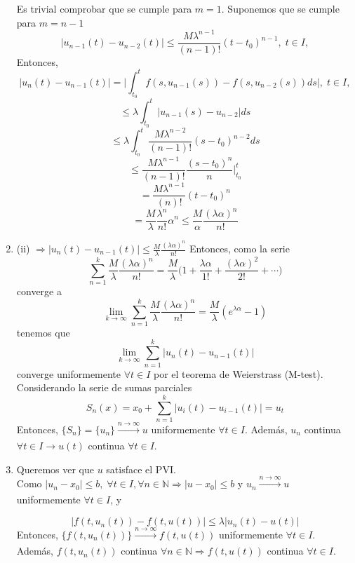 \begin{dem}
\begin{enumerate}[label=(\roman*)]
      Es trivial comprobar que se cumple para $m=1$. Suponemos que se cumple para $m=n-1$
      \[ 
        | u_{n-1}(t) - u_{n-2}(t) | \leq \frac{M \lambda^{n-1}}{(n-1)!}(t - t_{0})^{n-1}, \; t \in I,
      \] 
      Entonces, 
      \[ 
        | u_{n}(t) - u_{n-1}(t) | =  \Big | \int_{t_{0}}^{t} f(s, u_{n-1}(s)) - f(s, u_{n-2}(s)) ds \Big |, \; t \in I,
      \] 
      \[ 
        \leq \lambda \int_{t_{0}}^{t} | u_{n-1}(s) - u_{n-2} | ds
      \] 
      \[ 
        \leq \lambda \int_{t_{0}}^{t} \frac{M \lambda^{n-2}}{(n-1)!}(s - t_{0})^{n-2} ds 
      \] 
      \[ 
        \leq  \frac{M \lambda^{n-1}}{(n-1)!} \frac{(s-t_{0})^{n}}{n} \Bigg |_{t_{0}}^{t}
      \] 
      \[ 
        = \frac{M \lambda^{n-1}}{(n)!} (t - t_{0})^n 
      \] 
      \[ 
        = \frac{M}{\lambda} \frac{\lambda^n}{n!} \alpha^n \leq \frac{M}{\alpha} \frac{(\lambda \alpha)^n}{n!}
      \] 
    \item (ii) $\Rightarrow | u_{n}(t) - u_{n-1}(t) | \leq \frac{M}{\lambda} \frac{(\lambda \alpha)^{n}}{n!}$ Entonces, como la serie
      \[ 
        \sum_{n = 1}^{k} \frac{M}{\lambda}\frac{(\lambda \alpha)^{n}}{n!} = \frac{M}{\lambda}\big ( 1 + \frac{\lambda \alpha}{1!} + \frac{(\lambda \alpha)^{2}}{2!}  + \cdots \big )
      \] 
      converge a 
      \[ 
        \lim_{k \to \infty} \sum_{n = 1}^{k} \frac{M}{\lambda}\frac{(\lambda \alpha)^{n}}{n!} = \frac{M}{\lambda} ( e^{\lambda \alpha} -1)
      \] 
      tenemos que 
      \[ 
        \lim_{k \to \infty} \sum_{n = 1}^{k} | u_{n}(t) - u_{n-1}(t) | 
      \] 
      converge uniformemente $\forall t \in I$ por el teorema de Weierstrass (M-test).
      \\
      
      Considerando la serie de sumas parciales
      \[ 
        S_{n}(x) = x_{0} + \sum_{n=1}^{k} | u_{i}(t) - u_{i-1}(t) | = u_{t}
      \] 
      Entonces, $\{ S_{n} \} = \{ u_{n} \} \xrightarrow[]{n \rightarrow \infty} u$ uniformemente $\forall t \in I$. Además, $u_{n}$ continua $\forall t \in I \rightarrow u(t)$ continua $\forall t \in I$.
    \item Queremos ver que $u$ satisface el PVI. \\

      Como $| u_{n} - x_{0} | \leq b, \; \forall t \in I, \forall n \in \mathbb{N} \Rightarrow | u - x_{0} | \leq b$ y $u_{n} \xrightarrow[]{n \rightarrow \infty} u$ uniformemente $\forall t \in I$, y 

      \[ 
        | f(t, u_{n}(t)) - f(t, u(t)) | \leq \lambda | u_{n}(t) - u(t) | 
      \] 
      Entonces, $\{ f(t, u_{n}(t)) \} \xrightarrow[]{ n \rightarrow \infty } f(t, u(t))$ uniformemente $\forall t \in I$. Además, $f(t , u_{n}(t))$ continua $\forall n \in \mathbb{N} \Rightarrow f(t, u(t))$ continua $\forall t \in I$.


\end{enumerate}
\end{dem}
